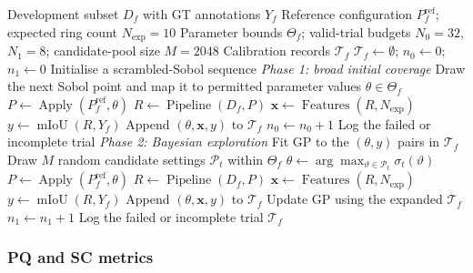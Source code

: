 \documentclass[a4paper,fleqn]{cas-dc}
\begin{document}
{\begin{algorithm}[ht]
\caption{Generating calibration examples through space-filling
sampling and Bayesian exploration}
\label{alg:bo_exploration}
\begin{algorithmic}[1]
\Require Development subset $D_f$ with GT annotations $Y_f$
\Require Reference configuration $P_f^{\mathrm{ref}}$; expected ring count $N_{\mathrm{exp}}=10$
\Require Parameter bounds $\Theta_f$;
         valid-trial budgets $N_0=32$, $N_1=8$;
         candidate-pool size $M=2048$
\Ensure Calibration records $\mathcal{T}_f$
\State $\mathcal{T}_f\gets\emptyset$;
       $n_0\gets0$; $n_1\gets0$
\State Initialise a scrambled-Sobol sequence
\Statex \textit{Phase 1: broad initial coverage}
    \State Draw the next Sobol point and map it to
           permitted parameter values $\theta\in\Theta_f$
    \State $P\gets\operatorname{Apply}
           (P_f^{\mathrm{ref}},\theta)$
    \State $R\gets\operatorname{Pipeline}(D_f,P)$
        \State $\mathbf{x}\gets\operatorname{Features}(R,N_{\mathrm{exp}})$
        \State $y\gets\operatorname{mIoU}(R,Y_f)$
        \State Append $(\theta,\mathbf{x},y)$
               to $\mathcal{T}_f$
        \State $n_0\gets n_0+1$
    \Else
        \State Log the failed or incomplete trial
    \EndIf
\EndWhile
\Statex \textit{Phase 2: Bayesian exploration}
\State Fit GP to the $(\theta,y)$ pairs in $\mathcal{T}_f$
    \State Draw $M$ random candidate settings
           $\mathcal{P}_t$ within $\Theta_f$
    \State $\theta\gets
           \arg\max_{\vartheta\in\mathcal{P}_t}
           \sigma_t(\vartheta)$
    \State $P\gets\operatorname{Apply}
           (P_f^{\mathrm{ref}},\theta)$
    \State $R\gets\operatorname{Pipeline}(D_f,P)$
        \State $\mathbf{x}\gets\operatorname{Features}(R,N_{\mathrm{exp}})$
        \State $y\gets\operatorname{mIoU}(R,Y_f)$
        \State Append $(\theta,\mathbf{x},y)$
               to $\mathcal{T}_f$
        \State Update GP using the expanded $\mathcal{T}_f$
        \State $n_1\gets n_1+1$
    \Else
        \State Log the failed or incomplete trial
    \EndIf
\EndWhile
\State \Return $\mathcal{T}_f$
\end{algorithmic}
\end{algorithm}

\subsubsection{PQ and SC metrics}
\label{sec:features}

}
\end{document}
